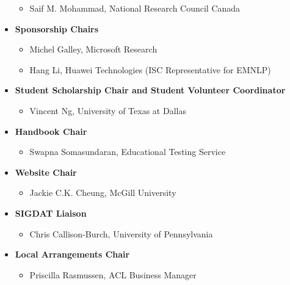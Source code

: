\begin{itemize}[itemsep=7pt, leftmargin=0cm, label={}]
\begin{itemize}[nosep, leftmargin=0.5cm, label={}]
\item Saif M. Mohammad, National Research Council Canada 
\end{itemize}
\item \textbf{Sponsorship Chairs}

\begin{itemize}[nosep, leftmargin=0.5cm, label={}]
\item Michel Galley, Microsoft Research 
\item Hang Li, Huawei Technologies (ISC Representative for EMNLP) 
\end{itemize}
\item \textbf{Student Scholarship Chair and Student Volunteer Coordinator}

\begin{itemize}[nosep, leftmargin=0.5cm, label={}]
\item Vincent Ng, University of Texas at Dallas 
\end{itemize}
\item \textbf{Handbook Chair}

\begin{itemize}[nosep, leftmargin=0.5cm, label={}]
\item Swapna Somasundaran, Educational Testing Service
\end{itemize}
\item \textbf{Website Chair}

\begin{itemize}[nosep, leftmargin=0.5cm, label={}]
\item Jackie C.K. Cheung, McGill University 
\end{itemize}
\item \textbf{SIGDAT Liaison}

\begin{itemize}[nosep, leftmargin=0.5cm, label={}]
\item Chris Callison-Burch, University of Pennsylvania
\end{itemize}
\item \textbf{Local Arrangements Chair}

\begin{itemize}[nosep, leftmargin=0.5cm, label={}]
\item Priscilla Rasmussen, ACL Business Manager 
\end{itemize}


\end{itemize}
